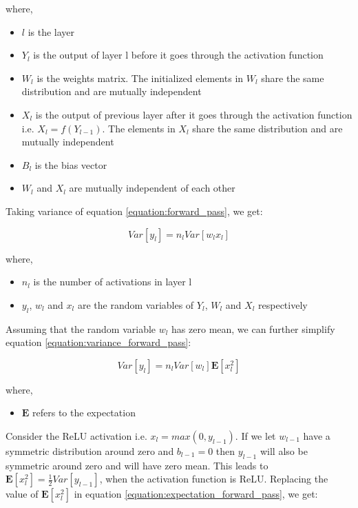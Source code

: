 where,
\begin{itemize}[label={}]
  \setlength\itemsep{0em}
  \item $l$ is the layer
  \item $Y_l$ is the output of layer l before it goes through the activation function
  \item $W_l$ is the weights matrix. The initialized elements in $W_l$ share the same distribution and are mutually independent
  \item $X_l$ is the output of previous layer after it goes through the activation function i.e. $X_l = f(Y_{l-1})$. The elements in $X_l$ share the same distribution and are mutually independent
  \item $B_l$ is the bias vector
  \item $W_l$ and $X_l$ are mutually independent of each other
\end{itemize}

Taking variance of equation \ref{equation:forward_pass}, we get:

\begin{equation}
    \label{equation:variance_forward_pass}
    Var[y_l] = n_l Var[w_lx_l]
\end{equation}

where,
\begin{itemize}[label={}]
  \setlength\itemsep{0em}
  \item $n_l$ is the number of activations in layer l
  \item $y_l$, $w_l$ and $x_l$ are the random variables of $Y_l$, $W_l$ and $X_l$ respectively
\end{itemize}

Assuming that the random variable $w_l$ has zero mean, we can further simplify equation \ref{equation:variance_forward_pass}:

\begin{equation}
    \label{equation:expectation_forward_pass}
    Var[y_l] = n_l Var[w_l]\mathbf{E}[x_l^2]
\end{equation}

where,
\begin{itemize}[label={}]
  \setlength\itemsep{0em}
  \item $\mathbf{E}$ refers to the expectation
\end{itemize}

Consider the ReLU activation i.e. $x_l = max(0, y_{l-1})$. If we let $w_{l-1}$ have a symmetric distribution around zero and $b_{l-1} = 0$ then $y_{l-1}$ will also be symmetric around zero and will have zero mean. This leads to $\mathbf{E}[x_l^2] = \frac{1}{2}Var[y_{l-1}]$, when the activation function is ReLU. Replacing the value of $\mathbf{E}[x_l^2]$ in equation \ref{equation:expectation_forward_pass}, we get:

